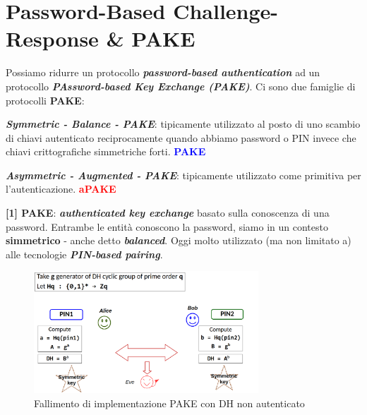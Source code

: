\newpage

\section{Password-Based Challenge-Response \& PAKE}

\begin{flushleft}

    Possiamo ridurre un protocollo \textbf{\textit{password-based authentication}} ad un protocollo \textbf{\textit{PAssword-based Key Exchange (PAKE)}}. Ci sono due famiglie di protocolli \textbf{PAKE}:

    \begin{center}
        \begin{minipage}[c]{0.45\textwidth}
            \textbf{\textit{Symmetric - Balance - PAKE}}: tipicamente utilizzato al posto di uno scambio di chiavi autenticato reciprocamente quando abbiamo password o PIN invece che chiavi crittografiche simmetriche forti. \textcolor{blue}{\textbf{PAKE}}
        \end{minipage}
        \hfill
        \begin{minipage}[c]{0.45\textwidth}
            \textbf{\textit{Asymmetric - Augmented - PAKE}}: tipicamente utilizzato come primitiva per l'autenticazione. \textcolor{red}{\textbf{aPAKE}}
        \end{minipage}
    \end{center}

    \bigskip

    \textbf{[1] PAKE}: \textbf{\textit{authenticated key exchange}} basato sulla conoscenza di una password. Entrambe le entità conoscono la password, siamo in un contesto \textbf{simmetrico} - anche detto \textbf{\textit{balanced}}. Oggi molto utilizzato (ma non limitato a) alle tecnologie \textbf{\textit{PIN-based pairing}}.

    \begin{figure}[h]
        \centering
        \includegraphics[width=0.75\textwidth]{img/pake_dh.png}
        \caption{Fallimento di implementazione PAKE con DH non autenticato}
    \end{figure}


\end{flushleft}
